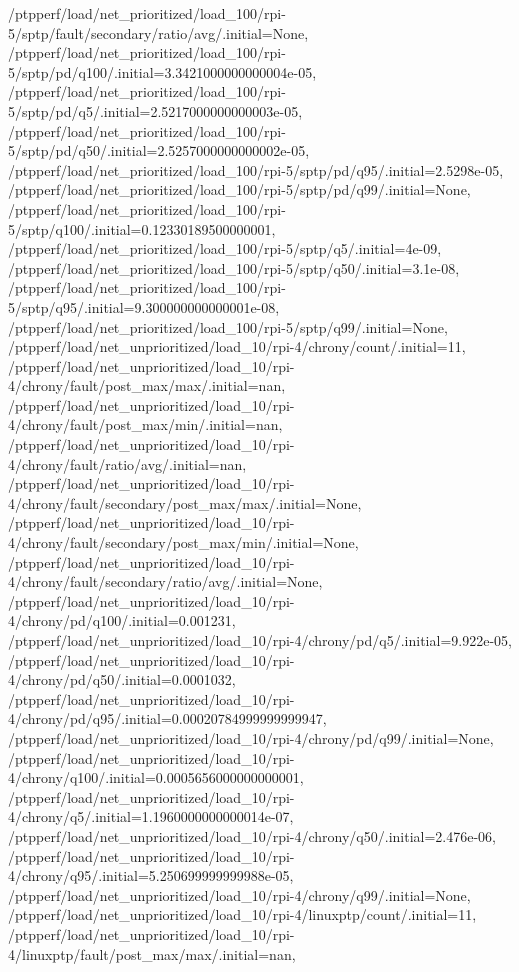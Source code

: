 {    /ptpperf/load/net_prioritized/load_100/rpi-5/sptp/fault/secondary/ratio/avg/.initial=None,
    /ptpperf/load/net_prioritized/load_100/rpi-5/sptp/pd/q100/.initial=3.3421000000000004e-05,
    /ptpperf/load/net_prioritized/load_100/rpi-5/sptp/pd/q5/.initial=2.5217000000000003e-05,
    /ptpperf/load/net_prioritized/load_100/rpi-5/sptp/pd/q50/.initial=2.5257000000000002e-05,
    /ptpperf/load/net_prioritized/load_100/rpi-5/sptp/pd/q95/.initial=2.5298e-05,
    /ptpperf/load/net_prioritized/load_100/rpi-5/sptp/pd/q99/.initial=None,
    /ptpperf/load/net_prioritized/load_100/rpi-5/sptp/q100/.initial=0.12330189500000001,
    /ptpperf/load/net_prioritized/load_100/rpi-5/sptp/q5/.initial=4e-09,
    /ptpperf/load/net_prioritized/load_100/rpi-5/sptp/q50/.initial=3.1e-08,
    /ptpperf/load/net_prioritized/load_100/rpi-5/sptp/q95/.initial=9.300000000000001e-08,
    /ptpperf/load/net_prioritized/load_100/rpi-5/sptp/q99/.initial=None,
    /ptpperf/load/net_unprioritized/load_10/rpi-4/chrony/count/.initial=11,
    /ptpperf/load/net_unprioritized/load_10/rpi-4/chrony/fault/post_max/max/.initial=nan,
    /ptpperf/load/net_unprioritized/load_10/rpi-4/chrony/fault/post_max/min/.initial=nan,
    /ptpperf/load/net_unprioritized/load_10/rpi-4/chrony/fault/ratio/avg/.initial=nan,
    /ptpperf/load/net_unprioritized/load_10/rpi-4/chrony/fault/secondary/post_max/max/.initial=None,
    /ptpperf/load/net_unprioritized/load_10/rpi-4/chrony/fault/secondary/post_max/min/.initial=None,
    /ptpperf/load/net_unprioritized/load_10/rpi-4/chrony/fault/secondary/ratio/avg/.initial=None,
    /ptpperf/load/net_unprioritized/load_10/rpi-4/chrony/pd/q100/.initial=0.001231,
    /ptpperf/load/net_unprioritized/load_10/rpi-4/chrony/pd/q5/.initial=9.922e-05,
    /ptpperf/load/net_unprioritized/load_10/rpi-4/chrony/pd/q50/.initial=0.0001032,
    /ptpperf/load/net_unprioritized/load_10/rpi-4/chrony/pd/q95/.initial=0.00020784999999999947,
    /ptpperf/load/net_unprioritized/load_10/rpi-4/chrony/pd/q99/.initial=None,
    /ptpperf/load/net_unprioritized/load_10/rpi-4/chrony/q100/.initial=0.0005656000000000001,
    /ptpperf/load/net_unprioritized/load_10/rpi-4/chrony/q5/.initial=1.1960000000000014e-07,
    /ptpperf/load/net_unprioritized/load_10/rpi-4/chrony/q50/.initial=2.476e-06,
    /ptpperf/load/net_unprioritized/load_10/rpi-4/chrony/q95/.initial=5.250699999999988e-05,
    /ptpperf/load/net_unprioritized/load_10/rpi-4/chrony/q99/.initial=None,
    /ptpperf/load/net_unprioritized/load_10/rpi-4/linuxptp/count/.initial=11,
    /ptpperf/load/net_unprioritized/load_10/rpi-4/linuxptp/fault/post_max/max/.initial=nan,
}
